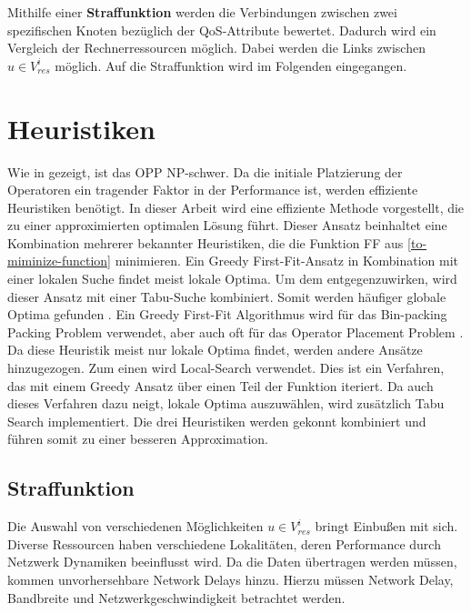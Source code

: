 \documentclass{article}
\begin{document}


Mithilfe einer \textbf{Straffunktion} werden die Verbindungen zwischen zwei spezifischen Knoten bezüglich der QoS-Attribute bewertet. Dadurch wird ein Vergleich 
der Rechnerressourcen möglich. Dabei werden die Links zwischen $u \in V_{res}^i$ möglich. Auf die Straffunktion wird im Folgenden eingegangen.




\section{Heuristiken} \label{Heurisiken}
Wie in \cite{cardellini-optimal_operatorplc} gezeigt, ist das 
OPP NP-schwer.
Da die initiale Platzierung der Operatoren ein tragender Faktor in der Performance ist, werden effiziente Heuristiken benötigt.
In dieser Arbeit wird eine effiziente Methode vorgestellt, die zu einer approximierten optimalen Lösung führt. 
Dieser Ansatz beinhaltet eine Kombination mehrerer bekannter Heuristiken, die die Funktion FF aus \ref{to-miminize-function} minimieren. 
Ein Greedy First-Fit-Ansatz in Kombination mit einer lokalen Suche findet meist lokale Optima. 
Um dem entgegenzuwirken, wird dieser Ansatz mit einer Tabu-Suche kombiniert. 
Somit werden häufiger globale Optima gefunden \cite{efficient-operator-placement}.
Ein Greedy First-Fit Algorithmus wird für das Bin-packing Packing Problem verwendet, 
aber auch oft für das Operator Placement Problem \cite{k7, k8}.
Da diese Heuristik meist nur lokale Optima findet, werden andere Ansätze hinzugezogen. 
Zum einen wird Local-Search verwendet. Dies ist ein Verfahren, 
das mit einem Greedy Ansatz über einen Teil der Funktion iteriert. Da auch dieses
Verfahren dazu neigt, lokale Optima auszuwählen, wird zusätzlich Tabu Search implementiert. 
Die drei Heuristiken werden gekonnt kombiniert und führen somit zu einer besseren Approximation. 

\subsection{Straffunktion} 
Die Auswahl von verschiedenen Möglichkeiten $u \in V_{res}^i$ bringt Einbußen mit sich. 
Diverse Ressourcen haben verschiedene Lokalitäten, deren Performance durch Netzwerk Dynamiken beeinflusst wird. 
Da die Daten übertragen werden müssen, kommen unvorhersehbare Network Delays hinzu. 
Hierzu müssen Network Delay, Bandbreite und Netzwerkgeschwindigkeit \cite{efficient-operator-placement} betrachtet werden.
\end{document}
